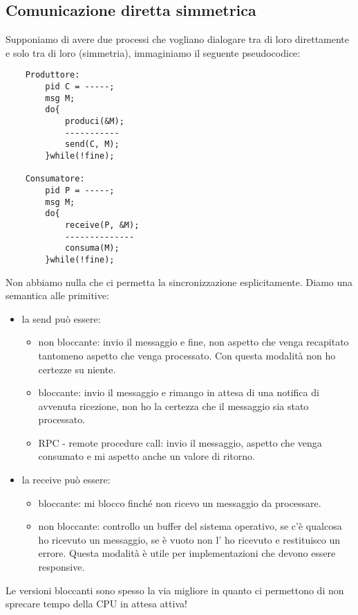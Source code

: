 \subsection{Comunicazione diretta simmetrica}
Supponiamo di avere due processi che vogliano dialogare tra di loro direttamente e solo tra di loro (simmetria), immaginiamo il seguente pseudocodice:
\begin{verbatim}
    Produttore:
        pid C = -----;
        msg M;
        do{
            produci(&M);
            -----------
            send(C, M);
        }while(!fine);
    
    Consumatore:
        pid P = -----;
        msg M;
        do{
            receive(P, &M);
            --------------
            consuma(M);
        }while(!fine);
\end{verbatim}
Non abbiamo nulla che ci permetta la sincronizzazione esplicitamente.
Diamo una semantica alle primitive:
\begin{itemize}
    \item la send può essere:
    \begin{itemize}
        \item non bloccante: invio il messaggio e fine, non aspetto che venga recapitato tantomeno aspetto che venga processato.
        Con questa modalità non ho certezze su niente.
        \item bloccante: invio il messaggio e rimango in attesa di una notifica di avvenuta ricezione, non ho la certezza che il messaggio sia stato processato.
        \item RPC - remote procedure call: invio il messaggio, aspetto che venga consumato e mi aspetto anche un valore di ritorno.
    \end{itemize}
    \item la receive può essere:
    \begin{itemize}
        \item bloccante: mi blocco finché non ricevo un messaggio da processare.
        \item non bloccante: controllo un buffer del sistema operativo, se c'è qualcosa ho ricevuto un messaggio, se è vuoto non l' ho ricevuto e restituisco un errore.
        Questa modalità è utile per implementazioni che devono essere responsive.
    \end{itemize}
\end{itemize}
Le versioni bloccanti sono spesso la via migliore in quanto ci permettono di non sprecare tempo della CPU in attesa attiva!

